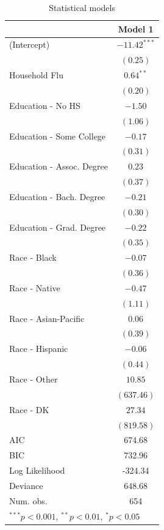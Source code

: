 \documentclass[12pt]{article}
\begin{document}
\begin{table}
\begin{center}
\begin{tabular}{l c }
\hline
 & Model 1 \\
\hline
(Intercept)            & $-11.42^{***}$ \\
                       & $(0.25)$       \\
Household Flu          & $0.64^{**}$    \\
                       & $(0.20)$       \\
Education - No HS         & $-1.50$        \\
                       & $(1.06)$       \\
Education - Some College  & $-0.17$        \\
                       & $(0.31)$       \\
Education - Assoc. Degree & $0.23$         \\
                       & $(0.37)$       \\
Education - Bach. Degree  & $-0.21$        \\
                       & $(0.30)$       \\
Education - Grad. Degree  & $-0.22$        \\
                       & $(0.35)$       \\
Race - Black              & $-0.07$        \\
                       & $(0.36)$       \\
Race - Native             & $-0.47$        \\
                       & $(1.11)$       \\
Race - Asian-Pacific      & $0.06$         \\
                       & $(0.39)$       \\
Race - Hispanic           & $-0.06$        \\
                       & $(0.44)$       \\
Race - Other              & $10.85$        \\
                       & $(637.46)$     \\
Race - DK                 & $27.34$        \\
                       & $(819.58)$     \\
\hline
AIC                    & 674.68         \\
BIC                    & 732.96         \\
Log Likelihood         & -324.34        \\
Deviance               & 648.68         \\
Num. obs.              & 654            \\
\hline
\multicolumn{2}{l}{\scriptsize{$^{***}p<0.001$, $^{**}p<0.01$, $^*p<0.05$}}
\end{tabular}
\caption{Statistical models}
\label{table:race_coefficients}
\end{center}
\end{table}
\end{document}
